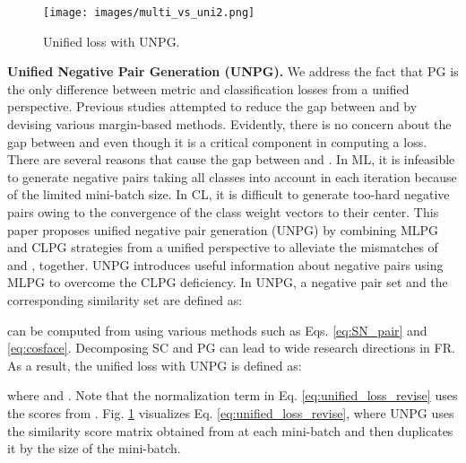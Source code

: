 \documentclass[10pt,twocolumn]{article}
\begin{document}
\begin{figure}[t]
  \texttt{[image: images/multi\_vs\_uni2.png]}
  \centering
  \caption{
  Unified loss with UNPG.
  }
  \label{uni_vis}
\end{figure}

\noindent\textbf{Unified Negative Pair Generation (UNPG).} We address the fact that PG is the only difference between metric and classification losses from a unified perspective. Previous studies\cite{wang2019multi, yu2019deep, liu2017sphereface, deng2019arcface, wang2018cosface, meng2021magface} attempted to reduce the gap between  and  by devising various margin-based methods. Evidently, there is no concern about the gap between  and  even though it is a critical component in computing a loss. There are several reasons that cause the gap between  and . In ML, it is infeasible to generate negative pairs taking all classes into account in each iteration because of the limited mini-batch size. In CL, it is difficult to generate too-hard negative pairs owing to the convergence of the class weight vectors to their center. This paper proposes unified negative pair generation (UNPG) by combining MLPG and CLPG strategies from a unified perspective to alleviate the mismatches of  and , together. UNPG introduces useful information about negative pairs using MLPG to overcome the CLPG deficiency. In UNPG, a negative pair set  and the corresponding similarity set  are defined as:


 can be computed from  using various methods such as Eqs. \ref{eq:SN_pair} and \ref{eq:cosface}. Decomposing SC and PG can lead to wide research directions in FR. \noindent As a result, the unified loss with UNPG is defined as:


where  and .
Note that the normalization term in Eq. \ref{eq:unified_loss_revise} uses the scores from   . Fig. \ref{uni_vis} visualizes Eq. \ref{eq:unified_loss_revise}, where UNPG uses the similarity score matrix obtained from  at each mini-batch and then duplicates it by the size of the mini-batch.
\end{document}
